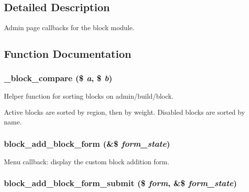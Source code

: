 \subsection{Detailed Description}
Admin page callbacks for the block module. 

\subsection{Function Documentation}
\hypertarget{block_8admin_8inc_821b5a94dc38440d9ae55657e4a2c1ea}{
\subsubsection[{\_\-block\_\-compare}]{\setlength{\rightskip}{0pt plus 5cm}\_\-block\_\-compare (\$ {\em a}, \/  \$ {\em b})}}
\label{block_8admin_8inc_821b5a94dc38440d9ae55657e4a2c1ea}


Helper function for sorting blocks on admin/build/block.

Active blocks are sorted by region, then by weight. Disabled blocks are sorted by name. \hypertarget{block_8admin_8inc_bcbf959ca716a7dccd1c642d95fc6f71}{
\subsubsection[{block\_\-add\_\-block\_\-form}]{\setlength{\rightskip}{0pt plus 5cm}block\_\-add\_\-block\_\-form (\&\$ {\em form\_\-state})}}
\label{block_8admin_8inc_bcbf959ca716a7dccd1c642d95fc6f71}


Menu callback: display the custom block addition form. \hypertarget{block_8admin_8inc_b1b62b97e79a16ab5a83cc746429601d}{
\subsubsection[{block\_\-add\_\-block\_\-form\_\-submit}]{\setlength{\rightskip}{0pt plus 5cm}block\_\-add\_\-block\_\-form\_\-submit (\$ {\em form}, \/  \&\$ {\em form\_\-state})}}
\label{block_8admin_8inc_b1b62b97e79a16ab5a83cc746429601d}


